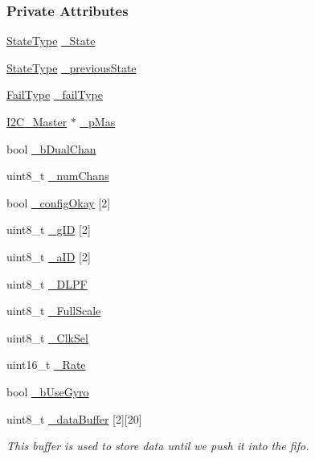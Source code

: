 \subsubsection*{Private Attributes}
\begin{DoxyCompactItemize}
\item 
\hyperlink{class_i_m_u_a7b5e1bf1cf1407b3e4cf0dd2e18b523f}{StateType} \hyperlink{class_i_m_u_a2e3c70d02cc2b3dd98ce8153d02cf04e}{\_\-State}
\item 
\hyperlink{class_i_m_u_a7b5e1bf1cf1407b3e4cf0dd2e18b523f}{StateType} \hyperlink{class_i_m_u_aca284ca1bcf10458005d4ca630833ea9}{\_\-previousState}
\item 
\hyperlink{class_i_m_u_a4edeb07a848734657792b4ef8749fb97}{FailType} \hyperlink{class_i_m_u_a39ed63b67b50c67520c5f8e5a2c26b26}{\_\-failType}
\item 
\hyperlink{class_i2_c___master}{I2C\_\-Master} $\ast$ \hyperlink{class_i_m_u_a466148932203b7250c83a4c5bb684ca1}{\_\-pMas}
\item 
bool \hyperlink{class_i_m_u_a62978e791838c3b4829e1d3d683e99b2}{\_\-bDualChan}
\item 
uint8\_\-t \hyperlink{class_i_m_u_a27df580b4559aaf3234469bfe16eb158}{\_\-numChans}
\item 
bool \hyperlink{class_i_m_u_a53aa928d2d68a5287da893bd157e7cbe}{\_\-configOkay} \mbox{[}2\mbox{]}
\item 
uint8\_\-t \hyperlink{class_i_m_u_a47ffe20a032e3a890cd3891793a60a40}{\_\-gID} \mbox{[}2\mbox{]}
\item 
uint8\_\-t \hyperlink{class_i_m_u_a10141bdc27465c95de6c8285d1542d78}{\_\-aID} \mbox{[}2\mbox{]}
\item 
uint8\_\-t \hyperlink{class_i_m_u_a3f9e6159234449cde8f5e72da8acf751}{\_\-DLPF}
\item 
uint8\_\-t \hyperlink{class_i_m_u_a059c02011a10bb90aecc9692ed345771}{\_\-FullScale}
\item 
uint8\_\-t \hyperlink{class_i_m_u_a4dbeaf17fd1ae9b41b5c3fe61706e5f1}{\_\-ClkSel}
\item 
uint16\_\-t \hyperlink{class_i_m_u_aafe9be107385c7ccedeb1539cf6d7fce}{\_\-Rate}
\item 
bool \hyperlink{class_i_m_u_a0cee90ebd5d0b57fa5ad3890c65108e2}{\_\-bUseGyro}
\item 
uint8\_\-t \hyperlink{class_i_m_u_ab87a54288295d4d10d605cf6c21d4d0f}{\_\-dataBuffer} \mbox{[}2\mbox{]}\mbox{[}20\mbox{]}
\begin{DoxyCompactList}\small\item\em This buffer is used to store data until we push it into the fifo. \item\end{DoxyCompactList}\item 

\end{DoxyCompactItemize}
